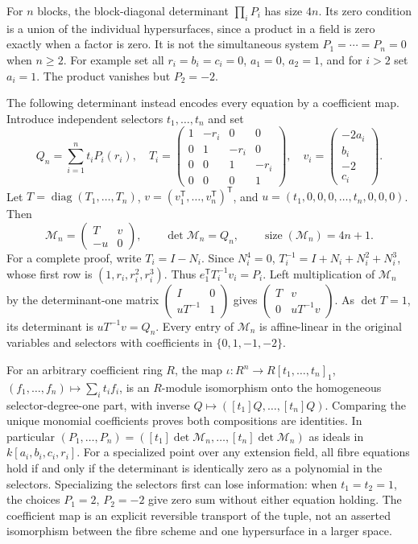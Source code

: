 For $n$ blocks, the block-diagonal determinant $\prod_i P_i$ has
size $4n$. Its zero condition is a union of the individual hypersurfaces,
since a product in a field is zero exactly when a factor is zero.
It is not the simultaneous system $P_1=\cdots=P_n=0$ when $n\ge2$.
For example set all $r_i=b_i=c_i=0$, $a_1=0$, $a_2=1$, and for
$i>2$ set $a_i=1$. The product vanishes but $P_2=-2$.

The following determinant instead encodes every equation by a coefficient
map. Introduce independent selectors $t_1,\ldots,t_n$ and set
\[
 Q_n=\sum_{i=1}^n t_iP_i(r_i),\quad
 T_i=\begin{pmatrix}1&-r_i&0&0\\0&1&-r_i&0\\0&0&1&-r_i\\0&0&0&1\end{pmatrix},
 \quad v_i=\begin{pmatrix}-2a_i\\b_i\\-2\\c_i\end{pmatrix}.
\]
Let $T=\operatorname{diag}(T_1,\ldots,T_n)$,
$v=(v_1^{\mathsf T},\ldots,v_n^{\mathsf T})^{\mathsf T}$, and
$u=(t_1,0,0,0,\ldots,t_n,0,0,0)$. Then
\[
 \mathcal M_n=\begin{pmatrix}T&v\\-u&0\end{pmatrix},
 \qquad \det\mathcal M_n=Q_n,
 \qquad \operatorname{size}(\mathcal M_n)=4n+1.
\]
For a complete proof, write $T_i=I-N_i$. Since $N_i^4=0$,
$T_i^{-1}=I+N_i+N_i^2+N_i^3$, whose first row is
$(1,r_i,r_i^2,r_i^3)$. Thus $e_1^{\mathsf T}T_i^{-1}v_i=P_i$.
Left multiplication of $\mathcal M_n$ by the determinant-one matrix
$\left(\begin{smallmatrix}I&0\\uT^{-1}&1\end{smallmatrix}\right)$
gives $\left(\begin{smallmatrix}T&v\\0&uT^{-1}v\end{smallmatrix}\right)$.
As $\det T=1$, its determinant is $uT^{-1}v=Q_n$.
Every entry of $\mathcal M_n$ is affine-linear in the original variables
and selectors with coefficients in $\{0,1,-1,-2\}$.

For an arbitrary coefficient ring $R$, the map
$\iota:R^n\to R[t_1,\ldots,t_n]_1$,
$(f_1,\ldots,f_n)\mapsto\sum_i t_if_i$, is an $R$-module
isomorphism onto the homogeneous selector-degree-one part, with inverse
$Q\mapsto([t_1]Q,\ldots,[t_n]Q)$. Comparing the unique monomial
coefficients proves both compositions are identities. In particular
$(P_1,\ldots,P_n)=([t_1]\det\mathcal M_n,\ldots,[t_n]\det\mathcal M_n)$
as ideals in $k[a_i,b_i,c_i,r_i]$. For a specialized point over any
extension field, all fibre equations hold if and only if the determinant
is identically zero as a polynomial in the selectors. Specializing the
selectors first can lose information: when $t_1=t_2=1$, the choices
$P_1=2$, $P_2=-2$ give zero sum without either equation holding.
The coefficient map is an explicit reversible transport of the tuple,
not an asserted isomorphism between the fibre scheme and one
hypersurface in a larger space.

